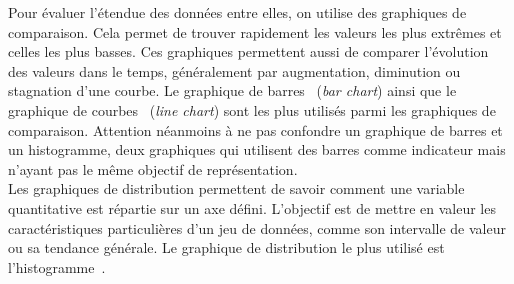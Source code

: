 Pour évaluer l'étendue des données entre elles, on utilise des graphiques de comparaison. Cela permet de trouver rapidement les valeurs les plus extrêmes et celles les plus basses. Ces graphiques permettent aussi de comparer l'évolution des valeurs dans le temps, généralement par augmentation, diminution ou stagnation d'une courbe. Le graphique de barres~\cite{barchart} (\textit{bar chart}) ainsi que le graphique de courbes~\cite{linechart} (\textit{line chart}) sont les plus utilisés parmi les graphiques de comparaison. Attention néanmoins à ne pas confondre un graphique de barres et un histogramme, deux graphiques qui utilisent des barres comme indicateur mais n'ayant pas le même objectif de représentation.\\

Les graphiques de distribution permettent de savoir comment une variable quantitative est répartie sur un axe défini. L'objectif est de mettre en valeur les caractéristiques particulières d'un jeu de données, comme son intervalle de valeur ou sa tendance générale. Le graphique de distribution le plus utilisé est l'histogramme~\cite{histogram}.